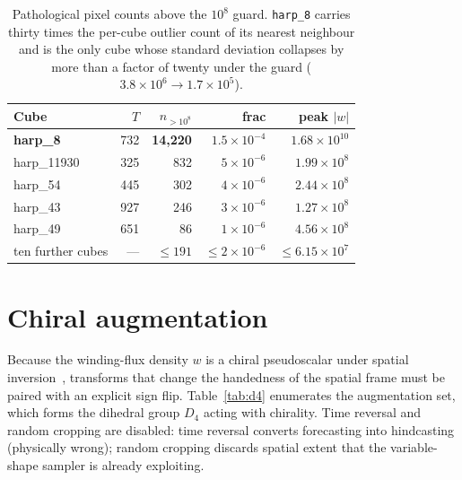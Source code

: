 \begin{table}[htbp]
\centering\small
\begin{tabular}{l r r r r}
\toprule
Cube & $T$ & $n_{>10^{8}}$ & frac & peak $|w|$ \\
\midrule
\textbf{harp\_8}  &  732 & \textbf{14{,}220} & $1.5\times10^{-4}$ & $1.68\times10^{10}$ \\
harp\_11930        &  325 & 832 & $5\times10^{-6}$ & $1.99\times10^{8}$ \\
harp\_54           &  445 & 302 & $4\times10^{-6}$ & $2.44\times10^{8}$ \\
harp\_43           &  927 & 246 & $3\times10^{-6}$ & $1.27\times10^{8}$ \\
harp\_49           &  651 &  86 & $1\times10^{-6}$ & $4.56\times10^{8}$ \\
ten further cubes  &  --- & $\leq 191$ & $\leq 2\times10^{-6}$ & $\leq 6.15\times10^{7}$ \\
\bottomrule
\end{tabular}
\caption{Pathological pixel counts above the $10^{8}$ guard.
\texttt{harp\_8} carries thirty times the per-cube outlier count of
its nearest neighbour and is the only cube whose standard deviation
collapses by more than a factor of twenty under the guard
($3.8\times10^{6} \to 1.7\times10^{5}$).}
\label{tab:clip-audit}
\end{table}

\section{Chiral augmentation}
\label{sec:data-aug}

Because the winding-flux density $w$ is a chiral pseudoscalar
under spatial inversion~\cite{prior2020helicity},
transforms that change the handedness of the spatial frame must be
paired with an explicit sign flip. Table~\ref{tab:d4} enumerates the
augmentation set, which forms the dihedral group $D_{4}$ acting with
chirality. Time
reversal and random cropping are disabled: time reversal converts
forecasting into hindcasting (physically wrong); random cropping
discards spatial extent that the variable-shape sampler is already
exploiting.

